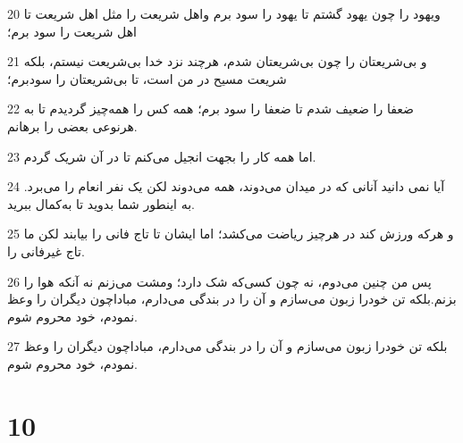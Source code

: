 \par 20 ویهود را چون یهود گشتم تا یهود را سود برم واهل شریعت را مثل اهل شریعت تا اهل شریعت را سود برم؛
\par 21 و بی‌شریعتان را چون بی‌شریعتان شدم، هرچند نزد خدا بی‌شریعت نیستم، بلکه شریعت مسیح در من است، تا بی‌شریعتان را سودبرم؛
\par 22 ضعفا را ضعیف شدم تا ضعفا را سود برم؛ همه کس را همه‌چیز گردیدم تا به هرنوعی بعضی را برهانم.
\par 23 اما همه کار را بجهت انجیل می‌کنم تا در آن شریک گردم.
\par 24 آیا نمی دانید آنانی که در میدان می‌دوند، همه می‌دوند لکن یک نفر انعام را می‌برد. به اینطور شما بدوید تا به‌کمال ببرید.
\par 25 و هرکه ورزش کند در هرچیز ریاضت می‌کشد؛ اما ایشان تا تاج فانی را بیابند لکن ما تاج غیرفانی را.
\par 26 پس من چنین می‌دوم، نه چون کسی‌که شک دارد؛ ومشت می‌زنم نه آنکه هوا را بزنم.بلکه تن خودرا زبون می‌سازم و آن را در بندگی می‌دارم، مباداچون دیگران را وعظ نمودم، خود محروم شوم.
\par 27 بلکه تن خودرا زبون می‌سازم و آن را در بندگی می‌دارم، مباداچون دیگران را وعظ نمودم، خود محروم شوم.

\chapter{10}

